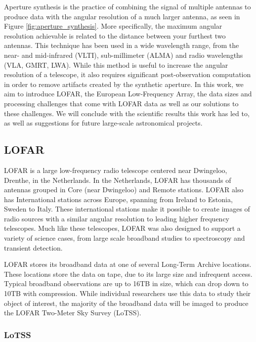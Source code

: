 Aperture synthesis is the practice of combining the signal of multiple antennas to produce data with the angular resolution of a much larger antenna, as seen in Figure \ref{fig:aperture_synthesis}. More specifically, the maximum angular resolution achievable is related to the distance between your furthest two antennas. This technique has been used in a wide wavelength range, from the near- and mid-infrared (VLTI), sub-millimeter (ALMA) and radio wavelengths (VLA, GMRT, LWA). While this method is useful to increase the angular resolution of a telescope, it also requires significant post-observation computation in order to remove artifacts created by the synthetic aperture. In this work, we aim to introduce LOFAR, the European Low-Frequency Array, the data sizes and processing challenges that come with LOFAR data as well as our solutions to these challenges. We will conclude with the scientific results this work has led to, as well as suggestions for future large-scale astronomical projects.

\subsection{LOFAR}

LOFAR is a large low-frequency radio telescope centered near Dwingeloo, Drenthe, in the Netherlands. In the Netherlands, LOFAR has thousands of antennas grouped in Core (near Dwingeloo) and Remote stations. LOFAR also has International stations across Europe, spanning from Ireland to Estonia, Sweden to Italy. These international stations make it possible to create images of radio sources with a similar angular resolution to leading higher frequency telescopes. Much like these telescopes, LOFAR was also designed to support a variety of science cases, from large scale broadband studies to spectroscopy and transient detection. 

LOFAR stores its broadband data at one of several Long-Term Archive locations. These locations store the data on tape, due to its large size and infrequent access. Typical broadband observations are up to 16TB in size, which can drop down to 10TB with compression. While individual researchers use this data to study their object of interest, the majority of the broadband data will be imaged to produce the LOFAR Two-Meter Sky Survey (LoTSS). 

\subsubsection{LoTSS} 

